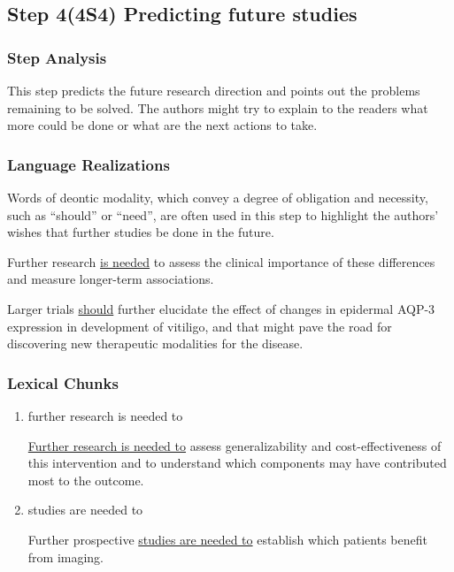 \documentclass{ctexbook}
\begin{document}
  \subsection{Step 4(4S4) Predicting future studies}
    \subsubsection{Step Analysis}

    This step predicts the future research direction and points out the problems remaining to be solved. The authors might try to explain to the readers what more could be done or what are the next actions to take.

    \subsubsection{Language Realizations}

    Words of deontic modality, which convey a degree of obligation and necessity, such as ``should'' or ``need'', are often used in this step to highlight the authors' wishes that further studies be done in the future.

    \begin{eg}{}
      Further research \uline{is needed} to assess the clinical importance of these differences and measure longer-term associations.  
    \end{eg}

    \begin{eg}{}
      Larger trials \uline{should} further elucidate the effect of changes in epidermal AQP-3 expression in development of vitiligo, and that might pave the road for discovering new therapeutic modalities for the disease. 
    \end{eg}

    \subsubsection{Lexical Chunks}

    \begin{enumerate}
      \item further research is needed to
      \begin{eg}{}
        \uline{Further research is needed to} assess generalizability and cost-effectiveness of this intervention and to understand which components may have contributed most to the outcome. 
      \end{eg}

      \item studies are needed to
      \begin{eg}{}
        Further prospective \uline{studies are needed to} establish which patients benefit from imaging.  
      \end{eg}

    \end{enumerate}
\end{document}
